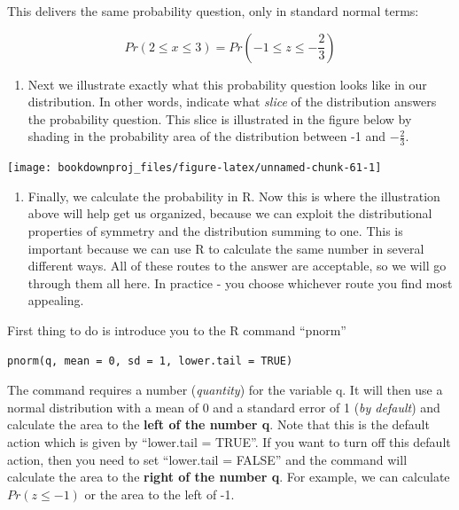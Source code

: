 \documentclass[
]{book}
\providecommand{\tightlist}{%
  \setlength{\itemsep}{0pt}\setlength{\parskip}{0pt}}
\begin{document}
This delivers the same probability question, only in standard normal terms:

\[Pr(2 \leq x \leq 3)=Pr\left(-1 \leq z \leq -\frac{2}{3}\right)\]

\begin{enumerate}
\def\labelenumi{\arabic{enumi}.}
\setcounter{enumi}{1}
\tightlist
\item
  Next we illustrate exactly what this probability question looks like in our distribution. In other words, indicate what \emph{slice} of the distribution answers the probability question. This slice is illustrated in the figure below by shading in the probability area of the distribution between -1 and \(-\frac{2}{3}\).
\end{enumerate}

\begin{center}\texttt{[image: bookdownproj\_files/figure-latex/unnamed-chunk-61-1]} \end{center}

\begin{enumerate}
\def\labelenumi{\arabic{enumi}.}
\setcounter{enumi}{2}
\tightlist
\item
  Finally, we calculate the probability in R. Now this is where the illustration above will help get us organized, because we can exploit the distributional properties of symmetry and the distribution summing to one. This is important because we can use R to calculate the same number in several different ways. All of these routes to the answer are acceptable, so we will go through them all here. In practice - you choose whichever route you find most appealing.
\end{enumerate}

First thing to do is introduce you to the R command ``pnorm''

\begin{verbatim}
pnorm(q, mean = 0, sd = 1, lower.tail = TRUE)
\end{verbatim}

The command requires a number (\emph{quantity}) for the variable q. It will then use a normal distribution with a mean of 0 and a standard error of 1 (\emph{by default}) and calculate the area to the \textbf{left of the number q}. Note that this is the default action which is given by ``lower.tail = TRUE''. If you want to turn off this default action, then you need to set ``lower.tail = FALSE'' and the command will calculate the area to the \textbf{right of the number q}. For example, we can calculate \(Pr(z\leq-1)\) or the area to the left of -1.
\end{document}
